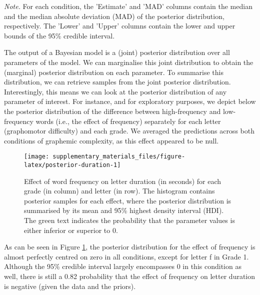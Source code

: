 \documentclass[
  11pt,
  english,
  ,doc,mask,floatsintext]{apa6}
\begin{document}
\begin{table}[htb]
\begin{center}
\begin{threeparttable}
{}

\begin{tablenotes}[para]
\normalsize{\textit{Note.} For each condition, the 'Estimate' and 'MAD' columns contain the
    median and the median absolute deviation (MAD) of the posterior distribution,
    respectively. The 'Lower' and 'Upper' columns contain the lower and upper
    bounds of the 95\% credible interval.}
\end{tablenotes}

\end{threeparttable}
\end{center}

\end{table}

The output of a Bayesian model is a (joint) posterior distribution over all parameters of the model. We can marginalise this joint distribution to obtain the (marginal) posterior distribution on each parameter. To summarise this distribution, we can retrieve samples from the joint posterior distribution. Interestingly, this means we can look at the posterior distribution of any parameter of interest. For instance, and for exploratory purposes, we depict below the posterior distribution of the difference between high-frequency and low-frequency words (i.e., the effect of frequency) separately for each letter (graphomotor difficulty) and each grade. We averaged the predictions across both conditions of graphemic complexity, as this effect appeared to be null.

\begin{figure}[!htb]

{\centering \texttt{[image: supplementary\_materials\_files/figure-latex/posterior-duration-1]} 

}

\caption{Effect of word frequency on letter duration (in seconds) for each grade (in column) and letter (in row). The histogram contains posterior samples for each effect, where the posterior distribution is summarised by its mean and 95\% highest density interval (HDI). The green text indicates the probability that the parameter values is either inferior or superior to 0.}\label{fig:posterior-duration}
\end{figure}

As can be seen in Figure \ref{fig:posterior-duration}, the posterior distribution for the effect of frequency is almost perfectly centred on zero in all conditions, except for letter f in Grade 1. Although the 95\% credible interval largely encompasses 0 in this condition as well, there is still a 0.82 probability that the effect of frequency on letter duration is negative (given the data and the priors).
\end{document}
